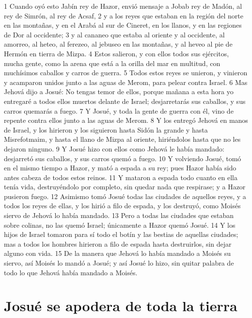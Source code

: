 1 Cuando oyó esto Jabín rey de Hazor, envió mensaje a Jobab rey de Madón, al rey de Simrón, al rey de Acsaf,
2 y a los reyes que estaban en la región del norte en las montañas, y en el Arabá al sur de Cineret, en los llanos, y en las regiones de Dor al occidente;
3 y al cananeo que estaba al oriente y al occidente, al amorreo, al heteo, al ferezeo, al jebuseo en las montañas, y al heveo al pie de Hermón en tierra de Mizpa.
4 Estos salieron, y con ellos todos sus ejércitos, mucha gente, como la arena que está a la orilla del mar en multitud, con muchísimos caballos y carros de guerra.
5 Todos estos reyes se unieron, y vinieron y acamparon unidos junto a las aguas de Merom, para pelear contra Israel.
6 Mas Jehová dijo a Josué: No tengas temor de ellos, porque mañana a esta hora yo entregaré a todos ellos muertos delante de Israel; desjarretarás sus caballos, y sus carros quemarás a fuego.
7 Y Josué, y toda la gente de guerra con él, vino de repente contra ellos junto a las aguas de Merom.
8 Y los entregó Jehová en manos de Israel, y los hirieron y los siguieron hasta Sidón la grande y hasta Misrefotmaim, y hasta el llano de Mizpa al oriente, hiriéndolos hasta que no les dejaron ninguno.
9 Y Josué hizo con ellos como Jehová le había mandado: desjarretó sus caballos, y sus carros quemó a fuego.
10 Y volviendo Josué, tomó en el mismo tiempo a Hazor, y mató a espada a su rey; pues Hazor había sido antes cabeza de todos estos reinos.
11 Y mataron a espada todo cuanto en ella tenía vida, destruyéndolo por completo, sin quedar nada que respirase; y a Hazor pusieron fuego.
12 Asimismo tomó Josué todas las ciudades de aquellos reyes, y a todos los reyes de ellas, y los hirió a filo de espada, y los destruyó, como Moisés siervo de Jehová lo había mandado.
13 Pero a todas las ciudades que estaban sobre colinas, no las quemó Israel; únicamente a Hazor quemó Josué.
14 Y los hijos de Israel tomaron para sí todo el botín y las bestias de aquellas ciudades; mas a todos los hombres hirieron a filo de espada hasta destruirlos, sin dejar alguno con vida.
15 De la manera que Jehová lo había mandado a Moisés su siervo, así Moisés lo mandó a Josué; y así Josué lo hizo, sin quitar palabra de todo lo que Jehová había mandado a Moisés.
\section*{Josué se apodera de toda la tierra}

